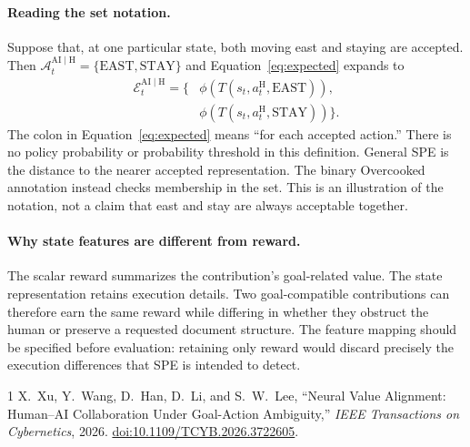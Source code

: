 \documentclass[11pt]{article}
\newcommand{\AIH}{\mathrm{AI}\mid\mathrm{H}}
\newcommand{\At}{\mathcal{A}_t^{\AIH}}
\newcommand{\Et}{\mathcal{E}_t^{\AIH}}
\begin{document}
\paragraph{Reading the set notation.}
Suppose that, at one particular state, both moving east and staying are
accepted. Then $\At=\{\mathrm{EAST},\mathrm{STAY}\}$ and
Equation~\eqref{eq:expected} expands to
\begin{equation*}
 \begin{split}
 \Et=\bigl\{&\phi(T(s_t,a_t^{\mathrm H},\mathrm{EAST})),\\
             &\phi(T(s_t,a_t^{\mathrm H},\mathrm{STAY}))\bigr\}.
 \end{split}
\end{equation*}
The colon in Equation~\eqref{eq:expected} means ``for each accepted action.''
There is no policy probability or probability threshold in this
definition. General SPE is the distance to the nearer accepted representation.
The binary Overcooked annotation instead checks membership in the set. This is an
illustration of the notation, not a claim that east and stay are always
acceptable together.

\paragraph{Why state features are different from reward.}
The scalar reward summarizes the contribution's goal-related value.
The state representation retains execution details. Two
goal-compatible contributions can therefore earn the same reward while
differing in whether they obstruct the human or preserve a requested
document structure. The feature mapping should be specified before
evaluation: retaining only reward would discard precisely the
execution differences that SPE is intended to detect.

\begin{thebibliography}{1}
X.~Xu, Y.~Wang, D.~Han, D.~Li, and S.~W.~Lee,
``Neural Value Alignment: Human--AI Collaboration Under Goal-Action Ambiguity,''
\emph{IEEE Transactions on Cybernetics}, 2026.
\href{https://doi.org/10.1109/TCYB.2026.3722605}{doi:10.1109/TCYB.2026.3722605}.
\end{thebibliography}
\end{document}
